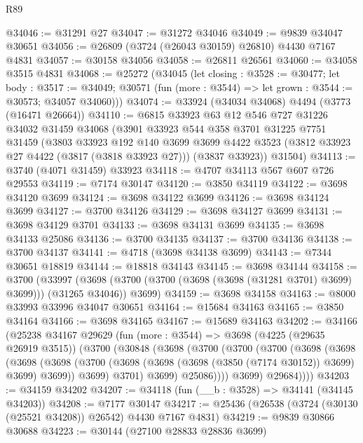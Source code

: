 \begin{lexlean}{R89}
\begin{coremodule}
@34046 := @31291 @27
@34047 := @31272 @34046
@34049 := @9839 @34047 @30651
@34056 := @26809 (@3724 (@26043 @30159) @26810) @4430 @7167 @4831
@34057 := @30158 @34056
@34058 := @26811 @26561
@34060 := @34058 @3515 @4831
@34068 := @25272
    (@34045
      (let closing : @3528 := @30477;
      let body : @3517 := @34049;
      @30571 (fun (more : @3544) => let grown : @3544 := @30573; @34057 @34060)))
@34074 := @33924 (@34034 @34068) @4494 (@3773 (@16471 @26664))
@34110 := @6815
    @33923
    @63
    @12
    @546
    @727
    @31226
    @34032
    @31459
    @34068
    (@3901
      @33923
      @544
      @358
      @3701
      @31225
      @7751
      @31459
      (@3803
        @33923
        @192
        @140
        @3699
        @3699
        @4422
        @3523
        (@3812 @33923 @27 @4422 (@3817 (@3818 @33923 @27)))
        (@3837 @33923))
      @31504)
@34113 := @3740 (@4071 @31459) @33923
@34118 := @4707 @34113 @567 @607 @726 @29553
@34119 := @7174 @30147
@34120 := @3850 @34119
@34122 := @3698 @34120 @3699
@34124 := @3698 @34122 @3699
@34126 := @3698 @34124 @3699
@34127 := @3700 @34126
@34129 := @3698 @34127 @3699
@34131 := @3698 @34129 @3701
@34133 := @3698 @34131 @3699
@34135 := @3698 @34133 @25086
@34136 := @3700 @34135
@34137 := @3700 @34136
@34138 := @3700 @34137
@34141 := @4718 (@3698 @34138 @3699)
@34143 := @7344 @30651 @18819
@34144 := @18818 @34143
@34145 := @3698 @34144
@34158 := @3700
    (@33997
      (@3698 (@3700 (@3700 (@3698 (@3698 (@31281 @3701) @3699) @3699))) (@31265 @34046))
      @3699)
@34159 := @3698 @34158
@34163 := @8000 @33993 @33996 @34047 @30651
@34164 := @15684 @34163
@34165 := @3850 @34164
@34166 := @3698 @34165
@34167 := @15689 @34163
@34202 := @34166
    (@25238
      @34167
      @29629
      (fun (more : @3544) =>
      @3698
        (@4225 (@29635 @26919 @3515))
        (@3700
          (@30848
            (@3698
              (@3700
                (@3700
                  (@3700
                    (@3698
                      (@3698
                        (@3698
                          (@3698
                            (@3700 (@3698 (@3698 (@3698 (@3850 (@7174 @30152)) @3699) @3699) @3699))
                            @3699)
                          @3701)
                        @3699)
                      @25086))))
              @3699)
            @29684))))
@34203 := @34159 @34202
@34207 := @34118 (fun (__b : @3528) => @34141 (@34145 @34203))
@34208 := @7177 @30147
@34217 := @25436 (@26538 (@3724 (@30130 (@25521 @34208)) @26542) @4430 @7167 @4831)
@34219 := @9839 @30866 @30688
@34223 := @30144 (@27100 @28833 @28836 @3699)

\end{coremodule}
\end{lexlean}
